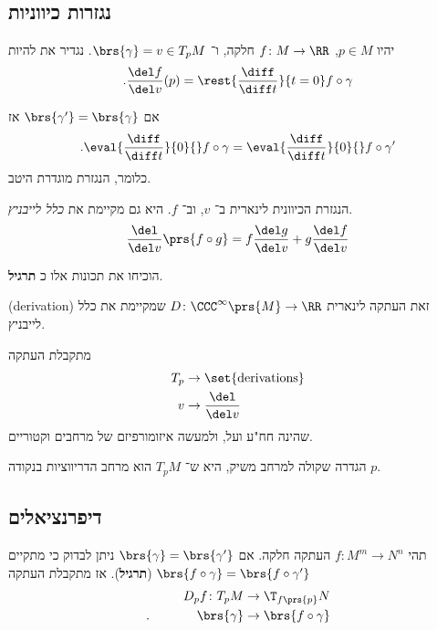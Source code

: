 \documentclass[a4paper,10pt,twoside,openany]{book}
\begin{document}
\subsection{נגזרות כיווניות}
יהיו
$p \in M$,
$f \colon M \to \RR$
חלקה,
ו־%
$\brs{\gamma} = v \in T_p M$.
נגדיר את
להיות
\begin{align*}
\text{.}\frac{\del f}{\del v}(p) = \rest{\frac{\diff}{\diff t}}{t=0} f \circ \gamma
\end{align*}

\begin{exercise}
אם
$\brs{\gamma'} = \brs{\gamma}$
אז
\begin{align*}
\text{.} \eval{\frac{\diff}{\diff t}}{0}{} f\circ \gamma = \eval{\frac{\diff}{\diff t}}{0}{} f\circ \gamma'
\end{align*}
כלומר, הנגזרת מוגדרת היטב.
\end{exercise}

הנגזרת הכיוונית לינארית ב־%
$v$,
וב־%
$f$.
היא גם מקיימת את
\emph{כלל לייבניץ}.
\begin{align*}
\frac{\del}{\del v} \prs{f \circ g} = f\frac{\del g}{\del v} + g\frac{\del f}{\del v}
\end{align*}

הוכיחו את תכונות אלו כ%
\textbf{תרגיל}.

\begin{definition}
\textenglish{(derivation)}
זאת העתקה לינארית
$D \colon \CCC^{\infty}\prs{M} \to \RR$
שמקיימת את כלל לייבניץ.
\end{definition}
\begin{remark}
מתקבלת העתקה
\begin{align*}
T_p &\to \set{\text{derivations}} \\
v &\to \frac{\del}{\del v}
\end{align*}
שהינה חח"ע ועל, ולמעשה איזומורפיזם של מרחבים וקטוריים.
\end{remark}
\begin{remark}
הגדרה שקולה למרחב משיק, היא ש־%
$T_p M$
הוא מרחב הדריווציות בנקודה
$p$.
\end{remark}
\subsection{דיפרנציאלים}
תהי
$f \colon M^m \to N^n$
העתקה חלקה. אם
$\brs{\gamma} = \brs{\gamma'}$
ניתן לבדוק כי מתקיים
$\brs{f\circ \gamma} = \brs{f\circ \gamma'}$
(\textbf{תרגיל}).
אז מתקבלת העתקה
\begin{align*}
D_p f \colon T_p M &\to \T_{f\prs{p}}N \\
\text{.} \phantom{D_p f XX} \brs{\gamma} &\to \brs{f\circ \gamma}
\end{align*}
\end{document}
